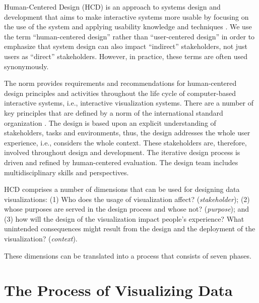 \documentclass[
]{book}
\begin{document}
Human-Centered Design (HCD) is an approach to systems design and development that aims to make interactive systems more usable by focusing on the use of the system and applying usability knowledge and techniques \citep{international2010ergonomics}. We use the term ``human-centered design'' rather than ``user-centered design'' in order to emphasize that system design can also impact ``indirect'' stakeholders, not just users as ``direct'' stakeholders. However, in practice, these terms are often used synonymously.

The norm provides requirements and recommendations for human-centered design principles and activities throughout the life cycle of computer-based interactive systems, i.e., interactive visualization systems. There are a number of key principles that are defined by a norm of the international standard organization \citep{international2010ergonomics}. The design is based upon an explicit understanding of stakeholders, tasks and environments, thus, the design addresses the whole user experience, i.e., considers the whole context. These stakeholders are, therefore, involved throughout design and development. The iterative design process is driven and refined by human-centered evaluation. The design team includes multidisciplinary skills and perspectives.

HCD comprises a number of dimensions \citep{KlingStar1998_HCD} that can be used for designing data visualizations: (1) Who does the usage of visualization affect? (\emph{stakeholder}); (2) whose purposes are served in the design process and whose not? (\emph{purpose}); and (3) how will the design of the visualization impact people's experience? What unintended consequences might result from the design and the deployment of the visualization? (\emph{context}).

These dimensions can be translated into a process that consists of seven phases.

\hypertarget{sec:processdataviz}{%
\chapter{The Process of Visualizing Data}\label{sec:processdataviz}}
\end{document}

